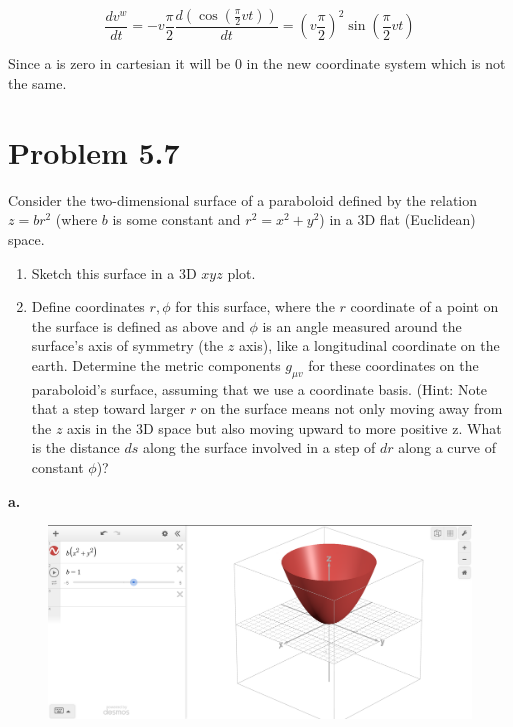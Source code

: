 \documentclass[12pt]{article}
\begin{document}
\[
      \frac{d v^w}{d t} = -v\frac{\pi}{2} \frac{d (\cos(\frac{\pi}{2}v t))}{d t}
      = {(v\frac{\pi}{2})}^2 \sin(\frac{\pi}{2}v t)
\]

Since a is zero in cartesian it will be 0 in the new coordinate system which is not the same.

\newpage

\section{Problem 5.7}

Consider the two-dimensional surface of a paraboloid defined by the relation \(z=b r^2\) (where \(b\) is some constant and \(r^2=x^2+y^2\)) in a 3D flat (Euclidean) space.

\begin{enumerate}
      \item Sketch this surface in a 3D \(x y z\) plot.
      \item Define coordinates \(r, \phi \) for this surface, where the \(r\) coordinate of a point on the surface is defined as above and \(\phi \) is an angle measured around the surface's axis of symmetry (the \(z\) axis), like a longitudinal coordinate on the earth. Determine the metric components \(g_{\mu v}\) for these coordinates on the paraboloid's surface, assuming that we use a coordinate basis. (Hint: Note that a step toward larger \(r\) on the surface means not only moving away from the \(z\) axis in the 3D space but also moving upward to more positive z. What is the distance \(d s\) along the surface involved in a step of \(d r\) along a curve of constant \(\phi \))?
\end{enumerate}

\textbf{a.}

\begin{figure}[H]
      \centering
      \includegraphics[scale=0.15]{Q3.png}
\end{figure}
\end{document}
